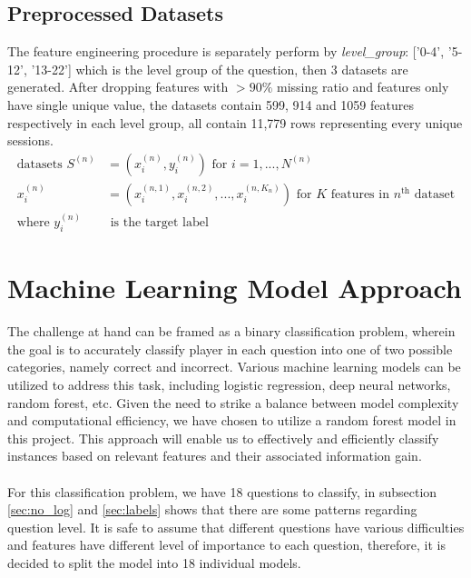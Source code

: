 \documentclass[11pt,a4paper]{article}
\begin{document}
    \subsection{Preprocessed Datasets}
    The feature engineering procedure is separately perform by \textit{level\_group}: ['0-4', '5-12', '13-22'] which is the level group of the question, then 3 datasets are generated. After dropping features with $> 90\%$ missing ratio and features only have single unique value, the datasets contain 599, 914 and 1059 features respectively in each level group, all contain 11,779 rows representing every unique sessions.
    \begin{align*}
        \text{datasets } S^{(n)} &= \left( x_i^{(n)}, y_i^{(n)} \right) \text{ for } i = 1, ..., N^{(n)} \\
        x_i^{(n)} &= \left( x_i^{(n, 1)}, x_i^{(n, 2)}, ..., x_i^{(n, K_n)} \right) \text{ for } K \text{ features in } n^\text{th} \text{ dataset} \\
        \text{where } y_i^{(n)}& \text{ is the target label}
    \end{align*}

    \section{Machine Learning Model Approach}
    The challenge at hand can be framed as a binary classification problem, wherein the goal is to accurately classify player in each question into one of two possible categories, namely correct and incorrect. Various machine learning models can be utilized to address this task, including logistic regression, deep neural networks, random forest, etc. Given the need to strike a balance between model complexity and computational efficiency, we have chosen to utilize a random forest model in this project. This approach will enable us to effectively and efficiently classify instances based on relevant features and their associated information gain. \\
    \\
    For this classification problem, we have 18 questions to classify, in subsection \ref{sec:no_log} and \ref{sec:labels} shows that there are some patterns regarding question level. It is safe to assume that different questions have various difficulties and features have different level of importance to each question, therefore, it is decided to split the model into 18 individual models.
\end{document}
